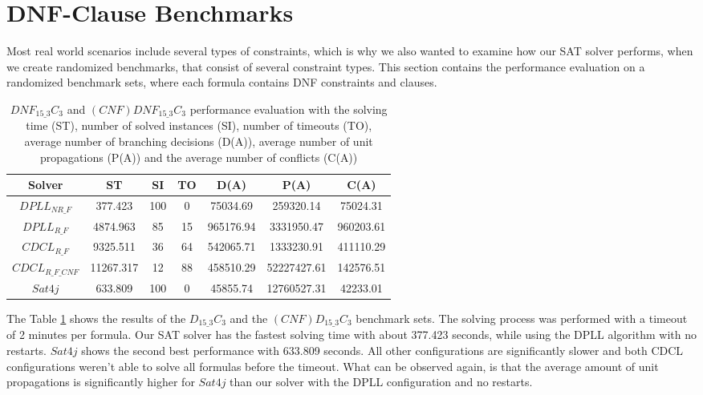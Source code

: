 \section{DNF-Clause Benchmarks}

Most real world scenarios include several types of constraints, which is why we also wanted to examine how our SAT solver performs, when we create randomized benchmarks, that consist of several constraint types. This section contains the performance evaluation on a randomized benchmark sets, where each formula contains DNF constraints and clauses.


\begin{table}[!htb]
\centering
\caption[$DNF_{15\_3}C_3$ and $(CNF)DNF_{15\_3}C_3$ performance evaluation]{$DNF_{15\_3}C_3$ and $(CNF)DNF_{15\_3}C_3$ performance evaluation with the solving time (ST), number of solved instances (SI), number of timeouts (TO), average number of branching decisions (D(A)), average number of unit propagations (P(A)) and the average number of conflicts (C(A))}
\label{tab:dnfClauseBenchmarkSAT}
\begin{tabular}{|c|c|c|c|c|c|c|}
\hline
Solver & ST & SI & TO & D(A) & P(A) & C(A)\\ 
\hline
$DPLL_{NR\_F}$ & 377.423 & 100 & 0 & 75034.69 & 259320.14 & 75024.31 \\ 
\hline
$DPLL_{R\_F}$ & 4874.963 & 85 & 15 & 965176.94 & 3331950.47 & 960203.61 \\ 
\hline
$CDCL_{R\_F}$ & 9325.511 & 36 & 64 & 542065.71 & 1333230.91 & 411110.29 \\ 
\hline
$CDCL_{R\_F\_CNF}$ & 11267.317 & 12 & 88 & 458510.29 & 52227427.61 & 142576.51 \\ 
\hline
$Sat4j$ & 633.809 & 100 & 0 & 45855.74 & 12760527.31 & 42233.01 \\ 
\hline
\end{tabular}
\end{table}

The Table \ref{tab:dnfClauseBenchmarkSAT} shows the results of the $D_{15\_3}C_3$ and the $(CNF)D_{15\_3}C_3$ benchmark sets. The solving process was performed with a timeout of 2 minutes per formula. Our SAT solver has the fastest solving time with about 377.423 seconds, while using the DPLL algorithm with no restarts. $Sat4j$ shows the second best performance with 633.809 seconds. All other configurations are significantly slower and both CDCL configurations weren't able to solve all formulas before the timeout. What can be observed again, is that the average amount of unit propagations is significantly higher for $Sat4j$ than our solver with the DPLL configuration and no restarts.

